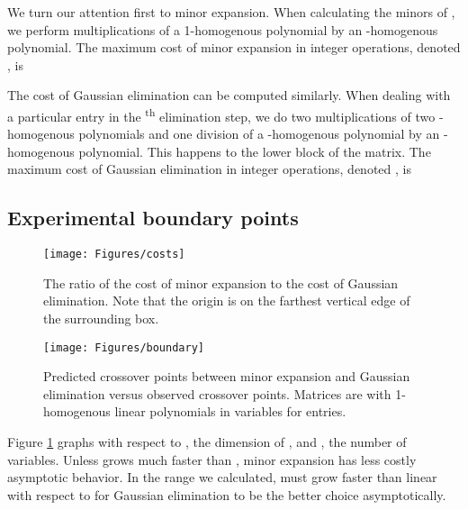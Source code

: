 \documentclass[12pt]{amsart}
\numberwithin{equation}{section}
\numberwithin{figure}{section}
\newcommand{\eq}[2][]{\ifthenelse{\equal{#1}{}}{\eqNoNum{#2}}{\eqNum{\label{#1}
#2}\\}}
\newcommand{\eqNoNum}[1]{}
\newcommand{\eqNum}[2]{}
\newcommand{\xth}{\textsuperscript{th}\xspace}
\begin{document}
We turn our attention first to minor expansion. When calculating the  minors of , we perform  multiplications of a 1-homogenous polynomial by an -homogenous polynomial. The maximum cost of minor expansion in integer operations, denoted , is
\eq{
C_M = s\sum_{i=2}^{n}i\binom{n}{i}\binom{i+s-2}{s-1} =
ns\sum_{i=1}^{n-1}\binom{n-1}{i}\binom{i+s-1}{s-1}.
}

The cost of Gaussian elimination can be computed similarly. When dealing with a particular entry in the \xth elimination step, we do two multiplications of two -homogenous polynomials and one division of a -homogenous polynomial by an -homogenous polynomial. This happens to the lower  block of the matrix. The maximum cost of Gaussian elimination in integer operations, denoted , is
\eq{
C_G = \sum_{i=1}^{n-1}(n-i)^2\left(2\binom{i+s-1}{s-1}^2 + \binom{2i+s-1}{s-1}\binom{i+s-2}{s-1}\right).
}
\begin{comment}
We note that a closed form for \eqref{costMinExp} can be written using a hypergeometric function; however, this is not to our knowledge possible for \eqref{costGaussElim}.
\end{comment}

\subsection{Experimental boundary points}
\begin{figure}[tb]
\texttt{[image: Figures/costs]}
\vspace{-.5\baselineskip}
\caption{The ratio of the cost of minor expansion to the cost of Gaussian elimination. Note that the origin is on the farthest vertical edge of the surrounding box.}
\label{costComparison}
\end{figure}

\begin{figure}[tb]
\texttt{[image: Figures/boundary]}
\vspace{-.5\baselineskip}
\caption{Predicted crossover points between minor expansion and Gaussian elimination versus observed crossover points. Matrices are  with 1-homogenous linear polynomials in  variables for entries.}
\label{theoryReality}
\end{figure}

Figure \ref{costComparison} graphs  with respect to , the dimension of , and , the number of variables. Unless  grows much faster than , minor expansion has less costly asymptotic behavior. In the range we calculated,  must grow faster than linear with respect to  for Gaussian elimination to be the better choice asymptotically.
\end{document}
